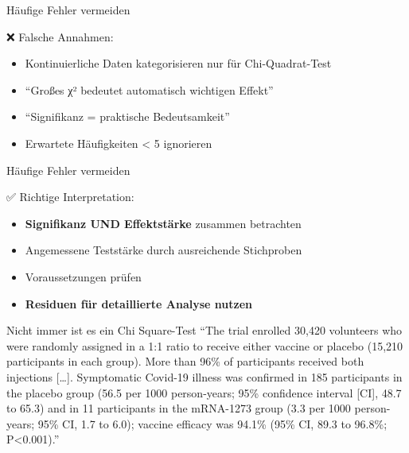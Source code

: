 \documentclass[
  ignorenonframetext,
]{beamer}
\providecommand{\tightlist}{%
  \setlength{\itemsep}{0pt}\setlength{\parskip}{0pt}}
\begin{document}
\begin{frame}{Häufige Fehler vermeiden}
\protect{}\label{huxe4ufige-fehler-vermeiden}
\begin{block}{❌ Falsche Annahmen:}
\protect{}\label{falsche-annahmen}
\begin{itemize}
\tightlist
\item
  Kontinuierliche Daten kategorisieren nur für Chi-Quadrat-Test
\item
  ``Großes χ² bedeutet automatisch wichtigen Effekt''
\item
  ``Signifikanz = praktische Bedeutsamkeit''
\item
  Erwartete Häufigkeiten \textless{} 5 ignorieren
\end{itemize}
\end{block}
\end{frame}

\begin{frame}{Häufige Fehler vermeiden}
\protect{}\label{huxe4ufige-fehler-vermeiden-1}
\begin{block}{✅ Richtige Interpretation:}
\protect{}\label{richtige-interpretation}
\begin{itemize}
\tightlist
\item
  \textbf{Signifikanz UND Effektstärke} zusammen betrachten
\item
  Angemessene Teststärke durch ausreichende Stichproben
\item
  Voraussetzungen prüfen
\item
  \textbf{Residuen für detaillierte Analyse nutzen}
\end{itemize}
\end{block}
\end{frame}

\begin{frame}{Nicht immer ist es ein Chi Square-Test}
\protect{}\label{nicht-immer-ist-es-ein-chi-square-test}
``The trial enrolled 30,420 volunteers who were randomly assigned in a
1:1 ratio to receive either vaccine or placebo (15,210 participants in
each group). More than 96\% of participants received both injections
{[}\ldots{]}. Symptomatic Covid-19 illness was confirmed in 185
participants in the placebo group (56.5 per 1000 person-years; 95\%
confidence interval {[}CI{]}, 48.7 to 65.3) and in 11 participants in
the mRNA-1273 group (3.3 per 1000 person-years; 95\% CI, 1.7 to 6.0);
vaccine efficacy was 94.1\% (95\% CI, 89.3 to 96.8\%;
P\textless0.001).''
\end{frame}
\end{document}
